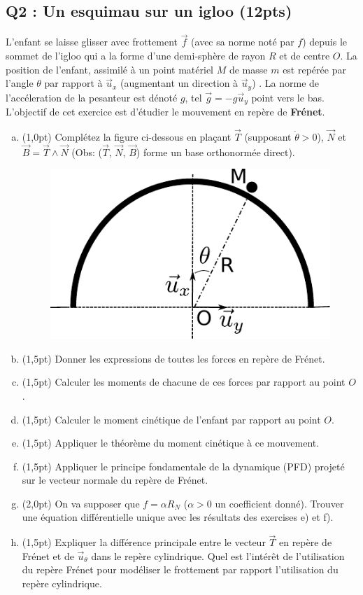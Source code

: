 \documentclass[french,10pt,twocolumn]{article}
\begin{document}
	\subsection*{Q2 : Un esquimau sur un igloo (12pts)} 
	L’enfant se laisse glisser avec frottement $\vec{f}$ (avec sa norme noté par $f$) depuis le sommet de l’igloo qui a la forme d’une demi-sphère de rayon $R$ et de centre $O$. La position de l'enfant, assimilé à un point matériel $M$ de masse $m$ est repérée par l’angle $\theta$ par rapport à $\vec{u}_x$ (augmentant un direction à $\vec{u}_y$) . La norme de l'accéleration de la pesanteur est dénoté $g$, tel $\vec{g} = -g\vec{u}_y$ point vers le bas. L'objectif de cet exercice est d'étudier le mouvement en repère de \textbf{Frénet}. 
	\begin{enumerate}[a)]
		\item(1,0pt) Complétez la figure ci-dessous en plaçant $\vec{T}$ (supposant $\dot{\theta}>0$), $\vec{N}$ et $\vec{B}=\vec{T}\wedge \vec{N}$ (Obs: ($\vec{T}$, $\vec{N}$, $\vec{B}$) forme un base orthonormée direct).
		\begin{figure}[h!]
			\centering
			\includegraphics[width=0.5\linewidth]{igloo}
			\caption*{}
		\end{figure}
		\vspace{-1cm}
		\item(1,5pt) Donner les expressions de toutes les forces en repère de Frénet.
		\item(1,5pt) Calculer les moments de chacune de ces forces par rapport au point $O$.
		\item(1,5pt) Calculer le moment cinétique de l'enfant par rapport au point $O$.
		\item(1,5pt) Appliquer le théorème du moment cinétique à ce mouvement.
		\item(1,5pt) Appliquer le principe fondamentale de la dynamique (PFD) projeté sur le vecteur normale du repère de Frénet.
		\item(2,0pt) On va supposer que $f = \alpha R_N$ ($\alpha >0$ un coefficient donné). Trouver une équation différentielle unique avec les résultats des exercises e) et f).
		\item(1,5pt) Expliquer la différence principale entre le vecteur $\vec{T}$ en repère de Frénet et de  $\vec{u}_{\theta}$ dans le repère cylindrique. Quel est l'intérêt de l'utilisation du repère Frénet pour modéliser le frottement par rapport l'utilisation du repère cylindrique. 
	\end{enumerate}
\end{document}
